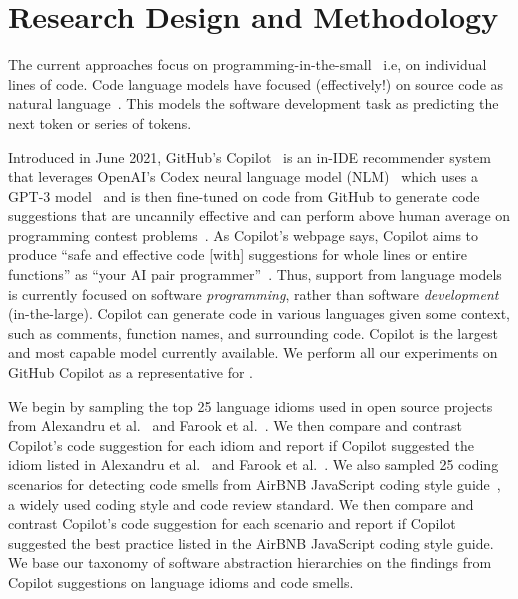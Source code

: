 \section{Research Design and Methodology}
The current \cct{} approaches focus on programming-in-the-small~\cite{DeRemer1976} i.e, on individual lines of code. 
Code language models have focused (effectively!) on source code as natural language~\cite{natural}.
This models the software development task as predicting the next token or series of tokens.

Introduced in June 2021, GitHub's Copilot~\cite{Copilot-web} is an in-IDE recommender system that leverages OpenAI's Codex neural language model (NLM)~\cite{copilot} which uses a GPT-3 model~\cite{Gpt3} and is then fine-tuned on code from GitHub to generate code suggestions that are uncannily effective and can perform above human average on programming contest problems~\cite{empirical_eval}. As Copilot's webpage says, Copilot aims to produce ``safe and effective code [with] suggestions for whole lines or entire functions'' as ``your AI pair programmer''~\cite{Copilot-web}. 
Thus, support from language models is currently focused on software \textit{programming}, rather than software \emph{development} (in-the-large).
Copilot can generate code in various languages given some context, such as comments, function names, and surrounding code. Copilot is the largest and most capable model currently available. We perform all our experiments on GitHub Copilot as a representative for \cct{}.

We begin by sampling the top 25 language idioms used in open source projects from Alexandru et al.~\cite{Alexandru2018} and Farook et al.~\cite{idioms}. We then compare and contrast Copilot's code suggestion for each idiom and report if Copilot suggested the idiom listed in Alexandru et al.~\cite{Alexandru2018} and Farook et al.~\cite{idioms}.
We also sampled 25 coding scenarios for detecting code smells from AirBNB JavaScript coding style guide~\cite{airbnb_code}, a widely used coding style and code review standard. We then compare and contrast Copilot's code suggestion for each scenario and report if Copilot suggested the best practice listed in the AirBNB JavaScript coding style guide. 
We base our taxonomy of software abstraction hierarchies on the findings from Copilot suggestions on language idioms and code smells.

